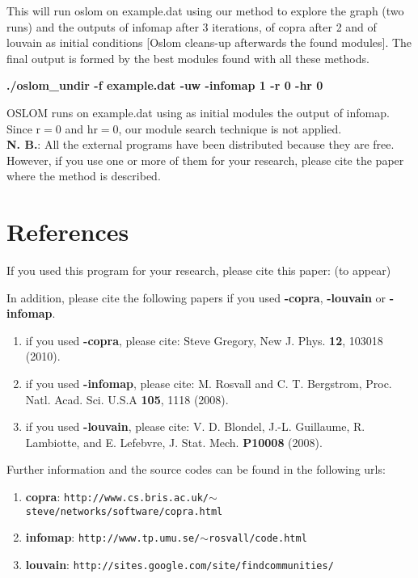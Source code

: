 \documentclass[11pt]{article}
\begin{document}
This will run oslom on example.dat using our method to explore the graph (two runs) and the outputs of infomap after 3 iterations, of copra after 2 and of louvain as initial conditions  [Oslom cleans-up afterwards the found modules]. The final output is formed by the best modules found with all these methods.   

  { \textbf{./oslom\_undir -f example.dat -uw -infomap 1 -r 0 -hr 0} }
  
OSLOM runs on example.dat using as initial modules the output of infomap. Since $\textrm{r} = 0$ and $\textrm{hr}=0$, our module search technique is not applied.
\\
  
  



  
  
   
    \textbf{N. B.}: All the external programs have been distributed
because they are free. However, 
if you use one or more of them for your research, please cite the
paper where the method is described.

    
  
  


\section{References}


If you used this program for your research, please cite this paper: (to appear)

\vskip0.3cm

\noindent In addition, please cite the following papers if you used  \textbf{-copra}, \textbf{-louvain} or \textbf{-infomap}.

\begin{enumerate}

  \item if you used \textbf{-copra}, please cite: Steve Gregory,
    New J. Phys. {\bf 12}, 103018 (2010).
  \item if you used \textbf{-infomap}, please cite: M. Rosvall and
    C. T. Bergstrom, Proc. Natl. Acad. Sci. U.S.A {\bf 105}, 1118 (2008).
\item if you used \textbf{-louvain}, please cite:   V. D. Blondel,
  J.-L. Guillaume, R. Lambiotte, and E. Lefebvre, J. Stat. Mech. {\bf
    P10008} (2008).
\end{enumerate}

Further information and the source codes can be found in the following urls:

\begin{enumerate}

  \item \textbf{copra}: {\tt http://www.cs.bris.ac.uk/$\sim$steve/networks/software/copra.html}
  \item \textbf{infomap}: {\tt http://www.tp.umu.se/$\sim$rosvall/code.html}
  \item \textbf{louvain}: {\tt http://sites.google.com/site/findcommunities/}
  \end{enumerate}
\end{document}
